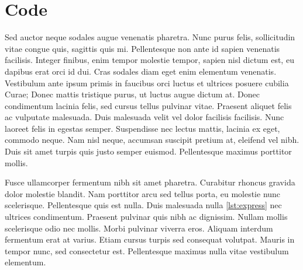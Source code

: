 \documentclass[%
    auto-generate   = true,             %
    debug           = true,             %
    print-ndn       = true,             %
    print-loa       = true,             %
    print-lof       = true,             %
    print-lot       = true,             %
    print-lol       = true,             %
    bib-file        = literature.bib,   %
    plantuml        = true              %
]{udhbwvst}
\begin{document}
\section{Code}

Sed auctor neque sodales augue venenatis pharetra. Nunc purus felis, sollicitudin vitae congue quis, sagittis quis mi. Pellentesque non ante id sapien venenatis facilisis. Integer finibus, enim tempor molestie tempor, sapien nisl dictum est, eu dapibus erat orci id dui. Cras sodales diam eget enim elementum venenatis. Vestibulum ante ipsum primis in faucibus orci luctus et ultrices posuere cubilia Curae; Donec mattis tristique purus, ut luctus augue dictum at. Donec condimentum lacinia felis, sed cursus tellus pulvinar vitae. Praesent aliquet felis ac vulputate malesuada. Duis malesuada velit vel dolor facilisis facilisis. Nunc laoreet felis in egestas semper. Suspendisse nec lectus mattis, lacinia ex eget, commodo neque. Nam nisl neque, accumsan suscipit pretium at, eleifend vel nibh. Duis sit amet turpis quis justo semper euismod. Pellentesque maximus porttitor mollis.


Fusce ullamcorper fermentum nibh sit amet pharetra. Curabitur rhoncus gravida dolor molestie blandit. Nam porttitor arcu sed tellus porta, eu molestie nunc scelerisque. Pellentesque quis est nulla. Duis malesuada nulla \autoref{lst:express} nec ultrices condimentum. Praesent pulvinar quis nibh ac dignissim. Nullam mollis scelerisque odio nec mollis. Morbi pulvinar viverra eros. Aliquam interdum fermentum erat at varius. Etiam cursus turpis sed consequat volutpat. Mauris in tempor nunc, sed consectetur est. Pellentesque maximus nulla vitae vestibulum elementum. 

\blinddocument
\end{document}
